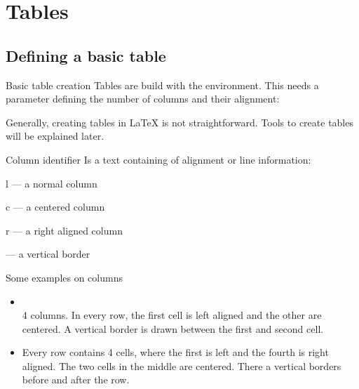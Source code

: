 \section{Tables}

\subsection{Defining a basic table}
\begin{frame}
	\begin{block}{Basic table creation}
		Tables are build with the  environment. This needs a
		parameter defining the number of columns and their alignment:
	\end{block}

	Generally, creating tables in {\LaTeX} is not straightforward. Tools to
	create tables will be explained later.
\end{frame}

\begin{frame}
	\begin{block}{Column identifier}
		Is a text containing of alignment or line information:
		\begin{mitemize}
			\item l --- a normal column
			\item c --- a centered column
			\item r --- a right aligned column
			\item \textbar --- a vertical border
		\end{mitemize}
	\end{block}
	\begin{exampleblock}{Some examples on columns}
		\begin{itemize}
			\item {}\\
				4 columns. In every row, the first cell is left aligned and the other are
				centered. A vertical border is drawn between the first and
				second cell.
			\item {}
				Every row contains 4 cells, where the first is left and the
				fourth is right aligned. The two cells in the middle are
				centered. There a vertical borders before and after the row.
		\end{itemize}
	\end{exampleblock}
\end{frame}

